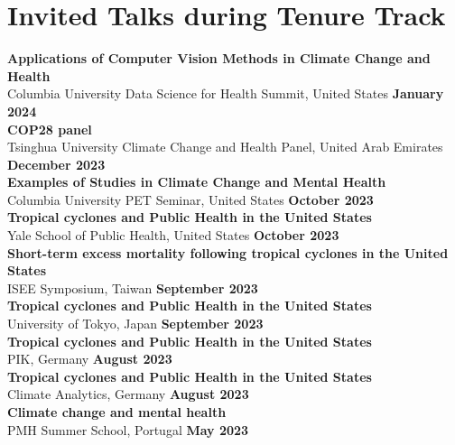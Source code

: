 \section*{Invited Talks during Tenure Track}

\noindent \textbf{Applications of Computer Vision Methods in Climate Change and Health} \\Columbia University Data Science for Health Summit, United States \hfill \textbf{January 2024}\\

\noindent \textbf{COP28 panel} \\Tsinghua University Climate Change and Health Panel, United Arab Emirates \hfill \textbf{December 2023}\\

\noindent \textbf{Examples of Studies in Climate Change and Mental Health} \\Columbia University PET Seminar, United States \hfill \textbf{October 2023}\\

\noindent \textbf{Tropical cyclones and Public Health in the United States} \\Yale School of Public Health, United States \hfill \textbf{October 2023}\\

\noindent \textbf{Short-term excess mortality following tropical cyclones in the United States} \\ISEE Symposium, Taiwan \hfill \textbf{September 2023}\\

\noindent \textbf{Tropical cyclones and Public Health in the United States} \\University of Tokyo, Japan \hfill \textbf{September 2023}\\

\noindent \textbf{Tropical cyclones and Public Health in the United States} \\PIK, Germany  \hfill \textbf{August 2023}\\

\noindent \textbf{Tropical cyclones and Public Health in the United States} \\Climate Analytics, Germany \hfill \textbf{August 2023}\\

\noindent \textbf{Climate change and mental health} \\PMH Summer School, Portugal \hfill \textbf{May 2023}\\

